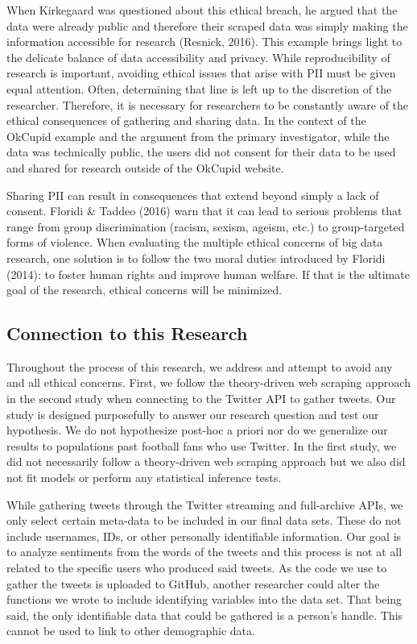 \documentclass[12pt,twoside]{reedthesis}
\begin{document}
When Kirkegaard was questioned about this ethical breach, he argued that
the data were already public and therefore their scraped data was simply
making the information accessible for research (Resnick, 2016). This
example brings light to the delicate balance of data accessibility and
privacy. While reproducibility of research is important, avoiding
ethical issues that arise with PII must be given equal attention. Often,
determining that line is left up to the discretion of the researcher.
Therefore, it is necessary for researchers to be constantly aware of the
ethical consequences of gathering and sharing data. In the context of
the OkCupid example and the argument from the primary investigator,
while the data was technically public, the users did not consent for
their data to be used and shared for research outside of the OkCupid
website.

Sharing PII can result in consequences that extend beyond simply a lack
of consent. Floridi \& Taddeo (2016) warn that it can lead to serious
problems that range from group discrimination (racism, sexism, ageism,
etc.) to group-targeted forms of violence. When evaluating the multiple
ethical concerns of big data research, one solution is to follow the two
moral duties introduced by Floridi (2014): to foster human rights and
improve human welfare. If that is the ultimate goal of the research,
ethical concerns will be minimized.

\subsection{Connection to this
Research}\label{connection-to-this-research}

Throughout the process of this research, we address and attempt to avoid
any and all ethical concerns. First, we follow the theory-driven web
scraping approach in the second study when connecting to the Twitter API
to gather tweets. Our study is designed purposefully to answer our
research question and test our hypothesis. We do not hypothesize
post-hoc a priori nor do we generalize our results to populations past
football fans who use Twitter. In the first study, we did not
necessarily follow a theory-driven web scraping approach but we also did
not fit models or perform any statistical inference tests.

While gathering tweets through the Twitter streaming and full-archive
APIs, we only select certain meta-data to be included in our final data
sets. These do not include usernames, IDs, or other personally
identifiable information. Our goal is to analyze sentiments from the
words of the tweets and this process is not at all related to the
specific users who produced said tweets. As the code we use to gather
the tweets is uploaded to GitHub, another researcher could alter the
functions we wrote to include identifying variables into the data set.
That being said, the only identifiable data that could be gathered is a
person's handle. This cannot be used to link to other demographic data.
\end{document}
